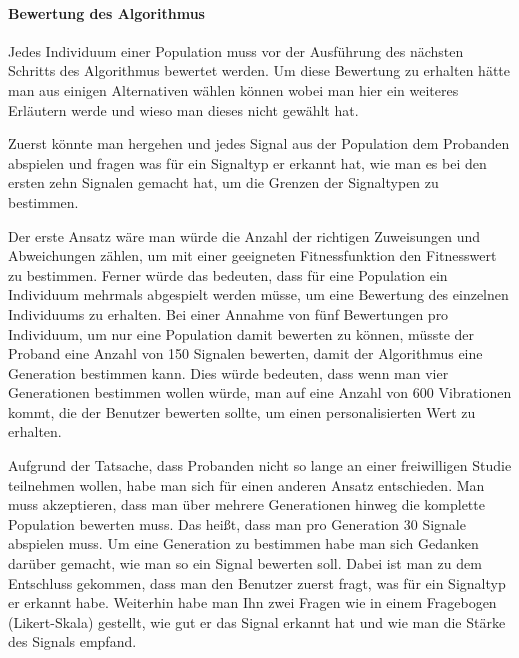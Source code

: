 \paragraph{Bewertung des Algorithmus}

Jedes Individuum einer Population muss vor der Ausf{\"u}hrung des n{\"a}chsten Schritts des Algorithmus bewertet werden.
Um diese Bewertung zu erhalten h{\"a}tte man aus einigen Alternativen w{\"a}hlen k{\"o}nnen wobei man hier ein weiteres Erl{\"a}utern werde und wieso man dieses nicht gew{\"a}hlt hat. 

Zuerst k{\"o}nnte man hergehen und jedes Signal aus der Population dem Probanden abspielen und fragen was f{\"u}r ein Signaltyp er erkannt hat, wie man es bei den ersten zehn Signalen gemacht hat, um die Grenzen der Signaltypen zu bestimmen. 

Der erste Ansatz w{\"a}re man w{\"u}rde die Anzahl der richtigen Zuweisungen und Abweichungen z{\"a}hlen, um mit einer geeigneten Fitnessfunktion den Fitnesswert zu bestimmen. 
Ferner w{\"u}rde das bedeuten, dass f{\"u}r eine Population ein Individuum mehrmals abgespielt werden m{\"u}sse, um eine Bewertung des einzelnen Individuums zu erhalten. 
Bei einer Annahme von f{\"u}nf Bewertungen pro Individuum, um nur eine Population damit bewerten zu k{\"o}nnen, m{\"u}sste der Proband eine Anzahl von 150 Signalen bewerten, damit der Algorithmus eine Generation bestimmen kann. 
Dies w{\"u}rde bedeuten, dass wenn man vier Generationen bestimmen wollen w{\"u}rde, man auf eine Anzahl von 600 Vibrationen kommt, die der Benutzer bewerten sollte, um einen personalisierten Wert zu erhalten. 

Aufgrund der Tatsache, dass Probanden nicht so lange an einer freiwilligen Studie teilnehmen wollen, habe man sich f{\"u}r einen anderen Ansatz entschieden. Man muss akzeptieren, dass man {\"u}ber mehrere Generationen hinweg die komplette Population bewerten muss. Das hei{\ss}t, dass man pro Generation 30 Signale abspielen muss. Um eine Generation zu bestimmen habe man sich Gedanken dar{\"u}ber gemacht, wie man so ein Signal bewerten soll. Dabei ist man zu dem Entschluss gekommen, dass man den Benutzer zuerst fragt, was f{\"u}r ein Signaltyp er erkannt habe. Weiterhin habe man Ihn zwei Fragen wie in einem Fragebogen (Likert-Skala) gestellt, wie gut er das Signal erkannt hat und wie man die St{\"a}rke des Signals empfand. 


